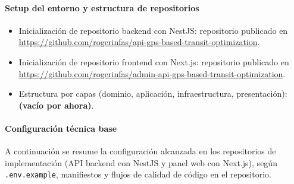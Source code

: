 \paragraph{Setup del entorno y estructura de repositorios}
\begin{itemize}
    \item Inicialización de repositorio backend con NestJS: repositorio publicado en \url{https://github.com/rogerinfas/api-gps-based-transit-optimization}.
    \item Inicialización de repositorio frontend con Next.js: repositorio publicado en \url{https://github.com/rogerinfas/admin-api-gps-based-transit-optimization}.
    \item Estructura por capas (dominio, aplicación, infraestructura, presentación): \textbf{(vacío por ahora)}.
\end{itemize}

\paragraph{Configuración técnica base}
A continuación se resume la configuración alcanzada en los repositorios de implementación (API backend con NestJS y panel web con Next.js), según \texttt{.env.example}, manifiestos y flujos de calidad de código en el repositorio.

